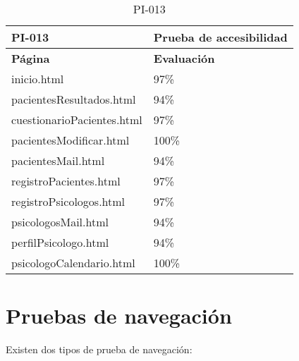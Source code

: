\begin{table}[htpb]
\centering
\begin{tabularx}{\textwidth}{|X|X|}
\hline
\textbf{PI-013}            & \textbf{Prueba de accesibilidad} \\ \hline
\textbf{Página}            & \textbf{Evaluación}              \\ \hline
inicio.html                & 97\%                             \\ \hline
pacientesResultados.html   & 94\%                             \\ \hline
cuestionarioPacientes.html & 97\%                             \\ \hline
pacientesModificar.html    & 100\%                            \\ \hline
pacientesMail.html         & 94\%                             \\ \hline
registroPacientes.html     & 97\%                             \\ \hline
registroPsicologos.html    & 97\%                             \\ \hline
psicologosMail.html        & 94\%                             \\ \hline
perfilPsicologo.html       & 94\%                             \\ \hline
psicologoCalendario.html   & 100\%                            \\ \hline
\end{tabularx}
\caption{PI-013}
\end{table}


\section{Pruebas de navegación}


Existen dos tipos de prueba de navegación:

